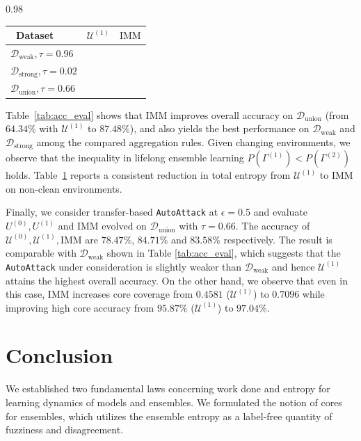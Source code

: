 \documentclass{article}
\theoremstyle{plain}
\theoremstyle{definition}
\theoremstyle{remark}
\newcommand{\cU}{\mathcal{U}}
\newcommand{\IMM}{\mathrm{IMM}}
\newcommand{\cD}{\mathcal{D}}
\begin{document}
\begin{table}[t]
\begin{subtable}{0.98\linewidth}
		\label{tab:ent_eval}
			\vspace{0.1in}
		\begin{tabular}{lcc}
			\toprule
			\  Dataset & $\cU^{(1)}$  & $\IMM$  \\
			\midrule
			$\cD_{\mathrm{weak}}, \tau = 0.96$& \makecell{$H = 0.6408 $}& \makecell{$H=0.2876 $}
			\\
			$\cD_{\mathrm{strong}}, \tau = 0.02$ & \makecell{$H =  1.9782$}& \makecell{$H=0.2054$}
\\
			$\cD_{\mathrm{union}}, \tau = 0.66$      &  \makecell{$H =  0.9638$}& \makecell{$H=0.2317$}
\\  
			\bottomrule
		\end{tabular}
\end{subtable}
\end{table}

Table~\ref{tab:acc_eval} shows that IMM improves overall accuracy on $\cD_{\mathrm{union}}$ (from $64.34\%$ with $\cU^{(1)}$ to $87.48\%$), and also yields the best performance on $\cD_{\mathrm{weak}}$ and $\cD_{\mathrm{strong}}$ among the compared aggregation rules.
Given changing environments, we observe that the inequality in lifelong ensemble learning $P(\Gamma^{(1)}) < P(\Gamma^{(2)})$ holds.
 Table~\ref{tab:ent_eval} reports a consistent reduction in total entropy from $\cU^{(1)}$ to IMM on non-clean environments.

Finally, we consider transfer-based \texttt{AutoAttack} at $\epsilon=0.5$ and evaluate $U^{(0)},U^{(1)}$ and $\IMM$ evolved on $\cD_{\mathrm{union}}$ with $\tau=0.66$.
The accuracy of $\cU^{(0)}, \cU^{(1)}, \IMM$ are $78.47\%$, $84.71\%$ and $83.58\%$ respectively. The result is comparable with $\cD_{\mathrm{weak}}$ shown in Table \ref{tab:acc_eval}, which suggests that the \texttt{AutoAttack} under consideration is slightly weaker than $\cD_{\mathrm{weak}}$ and hence $\cU^{(1)}$ attains the highest overall accuracy. On the other hand, we observe that even in this case, $\IMM$ increases core coverage from $0.4581$ ($\cU^{(1)}$) to $0.7096$ while improving high core accuracy from $95.87\%$ ($\cU^{(1)}$) to $97.04\%$.


\section{Conclusion}
We established two fundamental laws concerning work done and entropy for learning dynamics of models and ensembles. We formulated the notion of cores for ensembles, which utilizes the ensemble entropy as a label-free quantity of fuzziness and disagreement.
\end{document}
